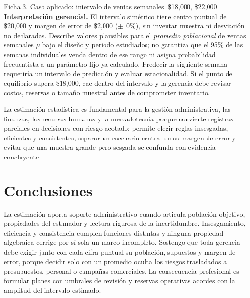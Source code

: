 \begin{fichainvestigacion}{Ficha 3. Caso aplicado: intervalo de ventas semanales [\$18,000, \$22,000]}
\textbf{Interpretación gerencial.} El intervalo simétrico tiene centro puntual de \$20,000 y margen de error de \$2,000 ($\pm 10\%$), sin inventar muestra ni desviación no declaradas. Describe valores plausibles para el \textit{promedio poblacional} de ventas semanales $\mu$ bajo el diseño y periodo estudiados; no garantiza que el 95\% de las semanas individuales venda dentro de ese rango ni asigna probabilidad frecuentista a un parámetro fijo ya calculado. Predecir la siguiente semana requeriría un intervalo de predicción y evaluar estacionalidad. Si el punto de equilibrio supera \$18,000, cae dentro del intervalo y la gerencia debe revisar costos, reservas o tamaño muestral antes de comprometer inventario.
\end{fichainvestigacion}

La estimación estadística es fundamental para la gestión administrativa, las finanzas, los recursos humanos y la mercadotecnia porque convierte registros parciales en decisiones con riesgo acotado: permite elegir reglas insesgadas, eficientes y consistentes, separar un escenario central de su margen de error y evitar que una muestra grande pero sesgada se confunda con evidencia concluyente \citep{wackerly2010,nistHandbook,bradley2021}.

\section{Conclusiones}
La estimación aporta soporte administrativo cuando articula población objetivo, propiedades del estimador y lectura rigurosa de la incertidumbre. Insesgamiento, eficiencia y consistencia cumplen funciones distintas y ninguna propiedad algebraica corrige por sí sola un marco incompleto. Sostengo que toda gerencia debe exigir junto con cada cifra puntual su población, supuestos y margen de error, porque decidir solo con un promedio oculta los riesgos trasladados a presupuestos, personal o campañas comerciales. La consecuencia profesional es formular planes con umbrales de revisión y reservas operativas acordes con la amplitud del intervalo estimado.



